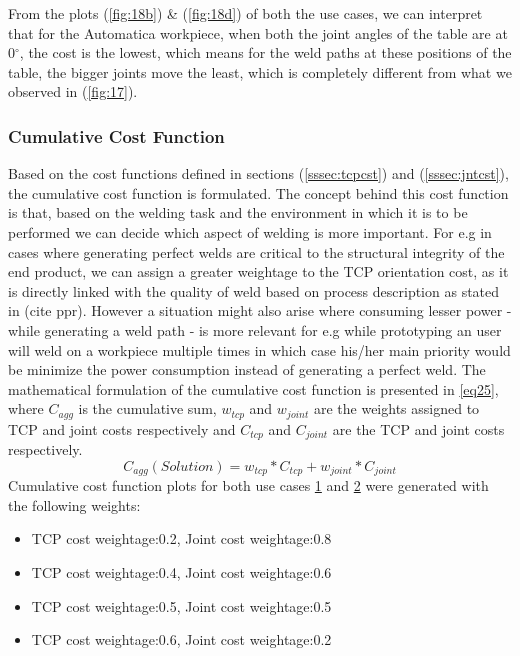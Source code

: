 From the plots (\ref{fig:18b}) \& (\ref{fig:18d}) of both the use cases, we can interpret that for the Automatica workpiece, when both the joint angles of the table are at 0$^{\circ}$, the cost is the lowest, which means for the weld paths at these positions of the table, the bigger joints move the least, which is completely different from what we observed in (\ref{fig:17}). 

\subsubsection{Cumulative Cost Function}
Based on the cost functions defined in sections (\ref{sssec:tcpcst}) and (\ref{sssec:jntcst}), the cumulative cost function is formulated. The concept behind this cost function is that, based on the welding task and the environment in which it is to be performed we can decide which aspect of welding is more important. For e.g in cases where generating perfect welds are critical to the structural integrity of the end product, we can assign a greater weightage to the TCP orientation cost, as it is directly linked with the quality of weld based on process description as stated in (cite ppr). However a situation might also arise where consuming lesser power - while generating a weld path - is more relevant for e.g while prototyping an user will weld on a workpiece multiple times in which case his/her main priority would be minimize the power consumption instead of generating a perfect weld. The mathematical formulation of the cumulative cost function is presented in \ref{eq25}, where $C_{agg}$ is the cumulative sum, $w_{tcp}$ and $w_{joint}$ are the weights assigned to TCP and joint costs respectively and $C_{tcp}$ and $C_{joint}$ are the TCP and joint costs respectively. 
\begin{equation}
\label{eq25}
C_{agg}(\textit{Solution}) = w_{tcp}* C_{tcp} +  w_{joint}*C_{joint}
\end{equation}
Cumulative cost function plots for both use cases \hyperref[fig:uc1]{1} and \hyperref[fig:uc2]{2} were generated with the following weights: 
\begin{itemize}
\item TCP cost weightage:0.2, Joint cost weightage:0.8 
\item TCP cost weightage:0.4, Joint cost weightage:0.6
\item TCP cost weightage:0.5, Joint cost weightage:0.5
\item TCP cost weightage:0.6, Joint cost weightage:0.2
\end{itemize}

